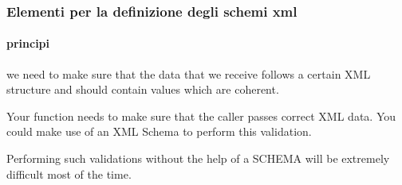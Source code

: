 



\begin{frame}
    \frametitle{Elementi per la definizione degli schemi xml}
    \framesubtitle{principi}
    \addtocounter{nframe}{1}

    we need to make sure that the data that we receive follows a certain XML structure and should contain values which are coherent. 

    Your function needs to make sure that the caller passes correct XML data. You could make use of an XML Schema to perform this validation.

    Performing such validations without the help of a SCHEMA will be extremely difficult most of the time.


\end{frame}

